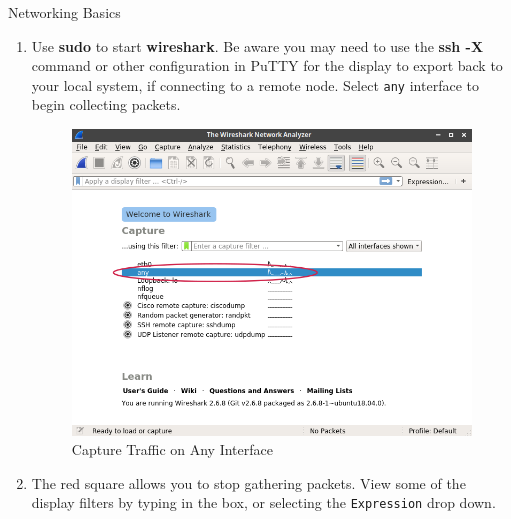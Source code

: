 \begin{Lab}
\begin{exe} {Networking Basics}
\begin{enumerate}
		\item
			Use \textbf{sudo} to start
			\textbf{wireshark}. Be aware you
			may need to use the \textbf{ssh -X}
			command or other configuration in 
			PuTTY for the display to export back 
			to your local system, if connecting 
			to a remote node. Select \verb:any:
			interface to begin collecting packets.
   \begin{figure}[H]
   \includegraphics[width=6.4in]{IMAGES/wireshark2}
   \caption{Capture Traffic on Any Interface}
      \end{figure}

		\item
			The red square allows you to stop gathering
			packets. View some of the display filters by
			typing in the box, or selecting the 
			\verb:Expression: drop down.


\end{enumerate}
\end{exe}
\end{Lab}
